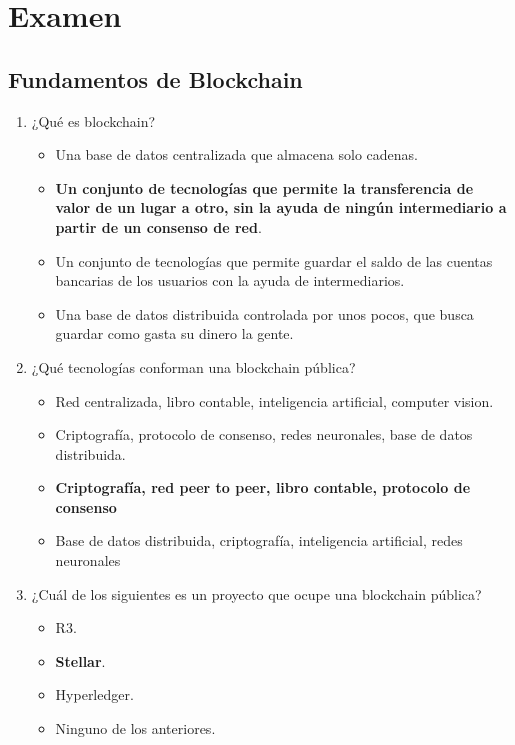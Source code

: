 \documentclass[a4paper,12pt]{/home/armando/Documentos/Cursos/LaTeX/Plantillas/lib/pub}
\begin{document}
\putLogo


\protecoTitle
\section{Examen}
\subsection{Fundamentos de Blockchain}
\begin{enumerate}
	\item ¿Qué es blockchain?
	\begin{itemize}
		\item Una base de datos centralizada que almacena solo cadenas.
		\item \textbf{Un conjunto de tecnologías que permite la transferencia de valor de un lugar a otro, sin la ayuda de ningún intermediario a partir de un consenso de red}.
		\item Un conjunto de tecnologías que permite guardar el saldo de las cuentas bancarias de los usuarios con la ayuda de intermediarios.
		\item Una base de datos distribuida controlada por unos pocos, que busca guardar como gasta su dinero la gente.
	\end{itemize}
	\item ¿Qué tecnologías conforman una blockchain pública?
	\begin{itemize}
		\item Red centralizada, libro contable, inteligencia artificial, computer vision.
		\item Criptografía, protocolo de consenso,  redes neuronales, base de datos distribuida.
		\item \textbf{Criptografía, red peer to peer, libro contable, protocolo de consenso}
		\item Base de datos distribuida, criptografía, inteligencia artificial, redes neuronales
	\end{itemize}
	\item ¿Cuál de los siguientes  es un proyecto que ocupe una blockchain pública?
	\begin{itemize}
		\item R3.
		\item \textbf{Stellar}.
		\item Hyperledger.
		\item Ninguno de los anteriores.
	\end{itemize}
\end{enumerate}
\end{document}
